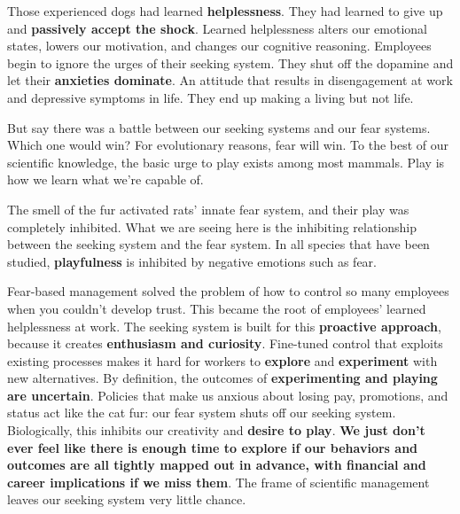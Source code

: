\documentclass[ebook,12pt,oneside,openany]{memoir}
\begin{document}
Those experienced dogs had learned \textbf{helplessness}. They had learned to give up and \textbf{passively accept the shock}.
Learned helplessness alters our emotional states, lowers our motivation, and changes our cognitive reasoning.
Employees begin to ignore the urges of their seeking system. They shut off the dopamine and let their \textbf{anxieties dominate}.
An attitude that results in disengagement at work and depressive symptoms in life. They end up making a living but not life.

But say there was a battle between our seeking systems and our fear systems. Which one would win? For evolutionary reasons, fear will win.
To the best of our scientific knowledge, the basic urge to play exists among most mammals. 
Play is how we learn what we're capable of. 

The smell of the fur activated rats' innate fear system, and their play was completely inhibited.
What we are seeing here is the inhibiting relationship between the seeking system and the fear system.
In all species that have been studied, \textbf{playfulness} is inhibited by negative emotions such as fear.

Fear-based management solved the problem of how to control so many employees when you couldn't develop trust.
This became the root of employees' learned helplessness at work.
The seeking system is built for this \textbf{proactive approach}, because it creates \textbf{enthusiasm and curiosity}.
Fine-tuned control that exploits existing processes makes it hard for workers to \textbf{explore} and \textbf{experiment} with new alternatives.
By definition, the outcomes of \textbf{experimenting and playing are uncertain}.
Policies that make us anxious about losing pay, promotions, and status act like the cat fur: our fear system shuts off our seeking system.
Biologically, this inhibits our creativity and \textbf{desire to play}.
\textbf{We just don't ever feel like there is enough time to explore if our behaviors and outcomes are all tightly mapped out in advance, with financial and career implications if we miss them}.
The frame of scientific management leaves our seeking system very little chance.
\end{document}
